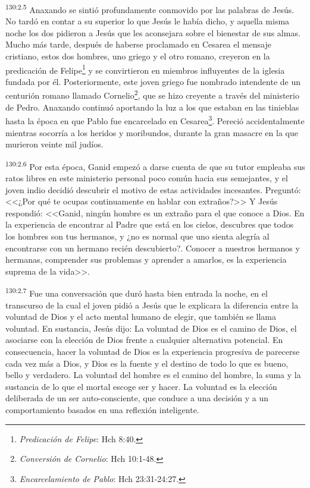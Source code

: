 \par 
\textsuperscript{130:2.5} Anaxando se sintió profundamente conmovido por las palabras de Jesús. No tardó en contar a su superior lo que Jesús le había dicho, y aquella misma noche los dos pidieron a Jesús que les aconsejara sobre el bienestar de sus almas. Mucho más tarde, después de haberse proclamado en Cesarea el mensaje cristiano, estos dos hombres, uno griego y el otro romano, creyeron en la predicación de Felipe\footnote{\textit{Predicación de Felipe}: Hch 8:40.} y se convirtieron en miembros influyentes de la iglesia fundada por él. Posteriormente, este joven griego fue nombrado intendente de un centurión romano llamado Cornelio\footnote{\textit{Conversión de Cornelio}: Hch 10:1-48.}, que se hizo creyente a través del ministerio de Pedro. Anaxando continuó aportando la luz a los que estaban en las tinieblas hasta la época en que Pablo fue encarcelado en Cesarea\footnote{\textit{Encarcelamiento de Pablo}: Hch 23:31-24:27.}. Pereció accidentalmente mientras socorría a los heridos y moribundos, durante la gran masacre en la que murieron veinte mil judíos.

\par 
\textsuperscript{130:2.6} Por esta época, Ganid empezó a darse cuenta de que su tutor empleaba sus ratos libres en este ministerio personal poco común hacia sus semejantes, y el joven indio decidió descubrir el motivo de estas actividades incesantes. Preguntó: <<¿Por qué te ocupas continuamente en hablar con extraños?>> Y Jesús respondió: <<Ganid, ningún hombre es un extraño para el que conoce a Dios. En la experiencia de encontrar al Padre que está en los cielos, descubres que todos los hombres son tus hermanos, y ¿no es normal que uno sienta alegría al encontrarse con un hermano recién descubierto?. Conocer a nuestros hermanos y hermanas, comprender sus problemas y aprender a amarlos, es la experiencia suprema de la vida>>.

\par 
\textsuperscript{130:2.7} Fue una conversación que duró hasta bien entrada la noche, en el transcurso de la cual el joven pidió a Jesús que le explicara la diferencia entre la voluntad de Dios y el acto mental humano de elegir, que también se llama voluntad. En sustancia, Jesús dijo: La voluntad de Dios es el camino de Dios, el asociarse con la elección de Dios frente a cualquier alternativa potencial. En consecuencia, hacer la voluntad de Dios es la experiencia progresiva de parecerse cada vez más a Dios, y Dios es la fuente y el destino de todo lo que es bueno, bello y verdadero. La voluntad del hombre es el camino del hombre, la suma y la sustancia de lo que el mortal escoge ser y hacer. La voluntad es la elección deliberada de un ser auto-consciente, que conduce a una decisión y a un comportamiento basados en una reflexión inteligente.

